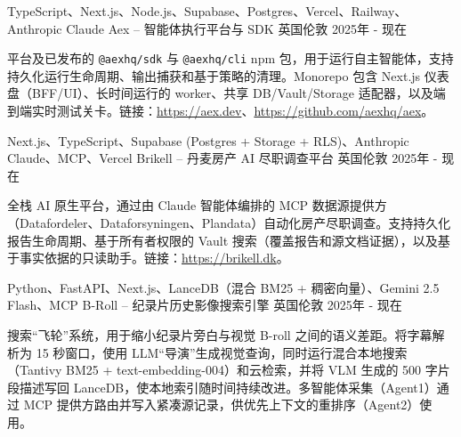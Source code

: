 
\begin{cventries}

\cventry
{TypeScript、Next.js、Node.js、Supabase、Postgres、Vercel、Railway、Anthropic Claude} %
{Aex -- 智能体执行平台与 SDK} %
{英国伦敦} %
{2025年 - 现在} %
{
\begin{cvitems} %
\item {平台及已发布的 \texttt{@aexhq/sdk} 与 \texttt{@aexhq/cli} npm 包，用于运行自主智能体，支持持久化运行生命周期、输出捕获和基于策略的清理。Monorepo 包含 Next.js 仪表盘（BFF/UI）、长时间运行的 worker、共享 DB/Vault/Storage 适配器，以及端到端实时测试关卡。链接：\href{https://aex.dev}{https://aex.dev}、\href{https://github.com/aexhq/aex}{https://github.com/aexhq/aex}。}
\end{cvitems}
}

\cventry
{Next.js、TypeScript、Supabase (Postgres + Storage + RLS)、Anthropic Claude、MCP、Vercel} %
{Brikell -- 丹麦房产 AI 尽职调查平台} %
{英国伦敦} %
{2025年 - 现在} %
{
\begin{cvitems} %
\item {全栈 AI 原生平台，通过由 Claude 智能体编排的 MCP 数据源提供方（Datafordeler、Dataforsyningen、Plandata）自动化房产尽职调查。支持持久化报告生命周期、基于所有者权限的 Vault 搜索（覆盖报告和源文档证据），以及基于事实依据的只读助手。链接：\href{https://brikell.dk}{https://brikell.dk}。}
\end{cvitems}
}

\cventry
{Python、FastAPI、Next.js、LanceDB（混合 BM25 + 稠密向量）、Gemini 2.5 Flash、MCP} %
{B-Roll -- 纪录片历史影像搜索引擎} %
{英国伦敦} %
{2025年 - 现在} %
{
\begin{cvitems} %
\item {搜索“飞轮”系统，用于缩小纪录片旁白与视觉 B-roll 之间的语义差距。将字幕解析为 15 秒窗口，使用 LLM“导演”生成视觉查询，同时运行混合本地搜索（Tantivy BM25 + text-embedding-004）和云检索，并将 VLM 生成的 500 字片段描述写回 LanceDB，使本地索引随时间持续改进。多智能体采集（Agent1）通过 MCP 提供方路由并写入紧凑源记录，供优先上下文的重排序（Agent2）使用。}
\end{cvitems}
}


\end{cventries}
